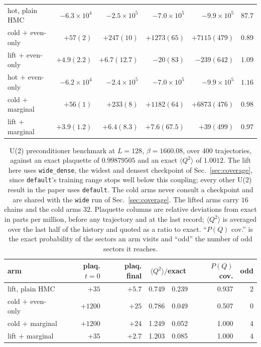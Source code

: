 \documentclass[prd, twocolumn, superscriptaddress, nofootinbib,floatfix]{revtex4-2}
\DeclareRobustCommand{\sect}[1]{Sec.~\ref{sec:#1}}
\begin{document}
\begin{table}[htbp]
\begin{tabular}{lrrrr@{\hspace{1.6em}}c}
hot, plain HMC      & $-6.3\times10^{4}$ & $-2.5\times10^{5}$ & $-7.0\times10^{5}$ & $-9.9\times10^{5}$ & $87.7$ \\
cold $+$ even-only & $+57(2)$ & $+247(10)$ & $+1273(65)$ & $+7115(479)$ & $0.89$ \\
lift $+$ even-only & $+4.9(2.2)$ & $+6.7(12.7)$ & $-20(83)$ & $-239(642)$ & $1.09$ \\
hot $+$ even-only  & $-6.2\times10^{4}$ & $-2.4\times10^{5}$ & $-7.0\times10^{5}$ & $-9.9\times10^{5}$ & $1.16$ \\
cold $+$ marginal  & $+56(1)$ & $+233(8)$ & $+1182(64)$ & $+6873(476)$ & $0.98$ \\
lift $+$ marginal  & $+3.9(1.2)$ & $+6.4(8.3)$ & $+7.6(67.5)$ & $+39(499)$ & $0.97$ \\
\bottomrule
\end{tabular}
\end{table}

\begin{table}[htbp]
\centering
\caption{U(2) preconditioner benchmark at $L=128$, $\beta=1660.08$, over $400$
trajectories, against an exact plaquette of $0.99879505$ and an exact
$\langle Q^2\rangle$ of $1.0012$. The lift here uses \texttt{wide\_dense}, the
widest and densest checkpoint of \sect{coverage}, since \texttt{default}'s
training range stops well below this coupling; every other U(2) result in the
paper uses \texttt{default}. The cold arms never consult a checkpoint and are
shared with the \texttt{wide} run of \sect{coverage}. The lifted arms carry $16$ chains and the cold
arms $32$. Plaquette columns are relative deviations from
exact in parts per million, before any trajectory and at the last record;
$\langle Q^2\rangle$ is averaged over the last half of the history and quoted as
a ratio to exact. ``$P(Q)$ cov.'' is the exact probability of the sectors an arm
visits and ``odd'' the number of odd sectors it reaches.}
\label{tab:u2_L128}
\begin{tabular}{lrrr@{\,$\pm$\,}lrr}
\toprule
arm & plaq. $t=0$ & plaq. final & \multicolumn{2}{c}{$\langle Q^2\rangle/$exact}
& $P(Q)$ cov. & odd \\
\midrule
lift, plain HMC    & $+35$ & $+5.7$ & 0.749 & 0.239 & 0.937 & 2 \\
cold $+$ even-only   & $+1200$ & $+25$ & 0.786 & 0.049 & 0.507 & 0 \\
cold $+$ marginal    & $+1200$ & $+24$ & 1.249 & 0.052 & 1.000 & 4 \\
lift $+$ marginal    & $+35$ & $+2.7$ & 1.203 & 0.085 & 1.000 & 4 \\
\bottomrule
\end{tabular}
\end{table}
\end{document}
